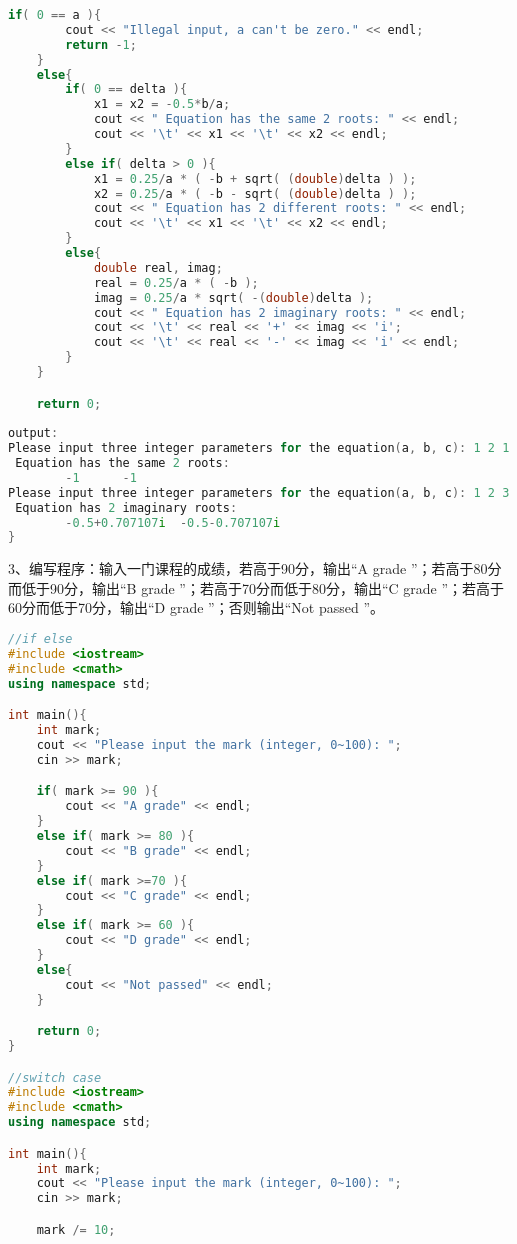 \documentclass[14pt,aps,prb]{revtex4}
\begin{document}
\begin{spacing}{1.5}
\begin{lstlisting}[language=C++]
    if( 0 == a ){
        cout << "Illegal input, a can't be zero." << endl;
        return -1;
    }
    else{
        if( 0 == delta ){
            x1 = x2 = -0.5*b/a;
            cout << " Equation has the same 2 roots: " << endl;
            cout << '\t' << x1 << '\t' << x2 << endl;
        }
        else if( delta > 0 ){
            x1 = 0.25/a * ( -b + sqrt( (double)delta ) );
            x2 = 0.25/a * ( -b - sqrt( (double)delta ) );
            cout << " Equation has 2 different roots: " << endl;
            cout << '\t' << x1 << '\t' << x2 << endl;
        }
        else{
            double real, imag;
            real = 0.25/a * ( -b );
            imag = 0.25/a * sqrt( -(double)delta );
            cout << " Equation has 2 imaginary roots: " << endl;
            cout << '\t' << real << '+' << imag << 'i';
            cout << '\t' << real << '-' << imag << 'i' << endl;
        }
    }

    return 0;
    
output:
Please input three integer parameters for the equation(a, b, c): 1 2 1
 Equation has the same 2 roots:
        -1      -1
Please input three integer parameters for the equation(a, b, c): 1 2 3
 Equation has 2 imaginary roots:
        -0.5+0.707107i  -0.5-0.707107i
}
\end{lstlisting}

3、编写程序：输入一门课程的成绩，若高于90分，输出“A  grade ”；若高于80分而低于90分，输出“B grade ”；若高于70分而低于80分，输出“C  grade ”；若高于60分而低于70分，输出“D  grade ”；否则输出“Not passed ”。
\begin{lstlisting}[language=C++]
//if else
#include <iostream>
#include <cmath>
using namespace std;

int main(){
    int mark;
    cout << "Please input the mark (integer, 0~100): ";
    cin >> mark;

    if( mark >= 90 ){
        cout << "A grade" << endl;
    }
    else if( mark >= 80 ){
        cout << "B grade" << endl;
    }
    else if( mark >=70 ){
        cout << "C grade" << endl;
    }
    else if( mark >= 60 ){
        cout << "D grade" << endl;
    }
    else{
        cout << "Not passed" << endl;
    }

    return 0;
}

//switch case
#include <iostream>
#include <cmath>
using namespace std;

int main(){
    int mark;
    cout << "Please input the mark (integer, 0~100): ";
    cin >> mark;

    mark /= 10;


\end{lstlisting}
\end{spacing}
\end{document}
